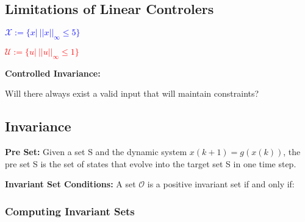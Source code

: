 \documentclass[8pt,a4paper]{scrartcl}
\begin{document}
\begin{multicols*}{3}
\subsection{Limitations of Linear Controlers}


\textcolor{blue}{$\mathcal{X}:=\{x|\ ||x||_\infty\leq 5\}$}

\finn

\textcolor{red}{$\mathcal{U}:=\{u|\ ||u||_\infty\leq 1\}$}


\textbf{Controlled Invariance:}

Will there always exist a valid input that will maintain constraints?

\subsection{Invariance}





\textbf{Pre Set:} Given a set S and the dynamic system $x(k+1)=g(x(k))$, the pre set S is the set of states that evolve into the target set S in one time step.


\textbf{Invariant Set Conditions:} A set $\mathcal{O}$ is a positive invariant set if and only if:


\subsubsection{Computing Invariant Sets}


\end{multicols*}
\end{document}

